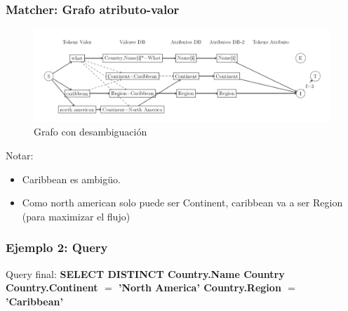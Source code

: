 \begin{frame}
\frametitle{Matcher: Grafo atributo-valor}
\begin{figure}
  \centering
    \includegraphics[scale=.43]{graficos/presentacion/ejemplo-grafo-2}
    \caption{Grafo con desambiguación}
\end{figure}

Notar:
  \begin{itemize}
    \item Caribbean es ambigüo.
    \item Como north american solo puede ser Continent, caribbean va a ser Region (para maximizar el flujo)
  \end{itemize}
\end{frame}

\begin{frame}[<+->]
\frametitle{Ejemplo 2: Query}
Query final:\newline
\Large{\textbf{{\color{purple}SELECT DISTINCT} Country.Name  Country  Country.Continent $=$ {\color{green}'North America'}  Country.Region $=$ {\color{green}'Caribbean'}}}

\end{frame}



